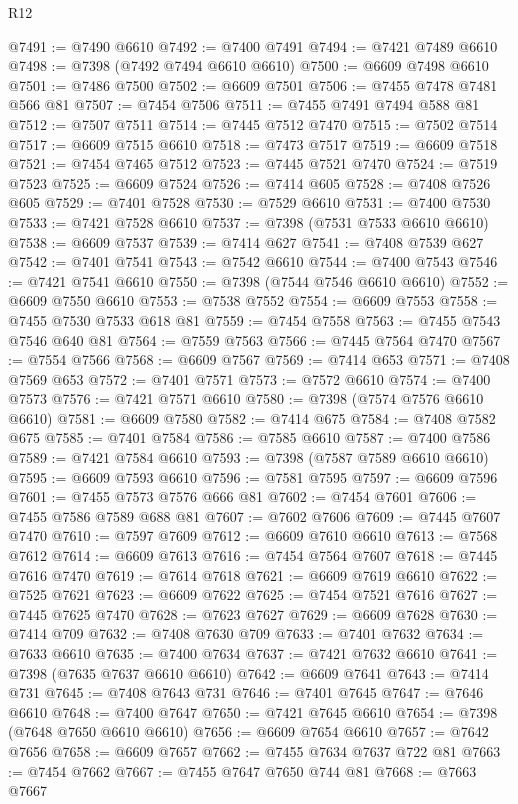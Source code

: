 \begin{lexlean}{R12}
\begin{coremodule}
{{{{{{{{{{{{{{{{{{{{{{{{{{{{{{{{{{{{{{{{{{{{{{{{{{{{{{{{{{{{{{{{{{{{{{{{{{{{{{{{{{@7491 := @7490 @6610
@7492 := @7400 @7491
@7494 := @7421 @7489 @6610
@7498 := @7398 (@7492 @7494 @6610 @6610)
@7500 := @6609 @7498 @6610
@7501 := @7486 @7500
@7502 := @6609 @7501
@7506 := @7455 @7478 @7481 @566 @81
@7507 := @7454 @7506
@7511 := @7455 @7491 @7494 @588 @81
@7512 := @7507 @7511
@7514 := @7445 @7512 @7470
@7515 := @7502 @7514
@7517 := @6609 @7515 @6610
@7518 := @7473 @7517
@7519 := @6609 @7518
@7521 := @7454 @7465 @7512
@7523 := @7445 @7521 @7470
@7524 := @7519 @7523
@7525 := @6609 @7524
@7526 := @7414 @605
@7528 := @7408 @7526 @605
@7529 := @7401 @7528
@7530 := @7529 @6610
@7531 := @7400 @7530
@7533 := @7421 @7528 @6610
@7537 := @7398 (@7531 @7533 @6610 @6610)
@7538 := @6609 @7537
@7539 := @7414 @627
@7541 := @7408 @7539 @627
@7542 := @7401 @7541
@7543 := @7542 @6610
@7544 := @7400 @7543
@7546 := @7421 @7541 @6610
@7550 := @7398 (@7544 @7546 @6610 @6610)
@7552 := @6609 @7550 @6610
@7553 := @7538 @7552
@7554 := @6609 @7553
@7558 := @7455 @7530 @7533 @618 @81
@7559 := @7454 @7558
@7563 := @7455 @7543 @7546 @640 @81
@7564 := @7559 @7563
@7566 := @7445 @7564 @7470
@7567 := @7554 @7566
@7568 := @6609 @7567
@7569 := @7414 @653
@7571 := @7408 @7569 @653
@7572 := @7401 @7571
@7573 := @7572 @6610
@7574 := @7400 @7573
@7576 := @7421 @7571 @6610
@7580 := @7398 (@7574 @7576 @6610 @6610)
@7581 := @6609 @7580
@7582 := @7414 @675
@7584 := @7408 @7582 @675
@7585 := @7401 @7584
@7586 := @7585 @6610
@7587 := @7400 @7586
@7589 := @7421 @7584 @6610
@7593 := @7398 (@7587 @7589 @6610 @6610)
@7595 := @6609 @7593 @6610
@7596 := @7581 @7595
@7597 := @6609 @7596
@7601 := @7455 @7573 @7576 @666 @81
@7602 := @7454 @7601
@7606 := @7455 @7586 @7589 @688 @81
@7607 := @7602 @7606
@7609 := @7445 @7607 @7470
@7610 := @7597 @7609
@7612 := @6609 @7610 @6610
@7613 := @7568 @7612
@7614 := @6609 @7613
@7616 := @7454 @7564 @7607
@7618 := @7445 @7616 @7470
@7619 := @7614 @7618
@7621 := @6609 @7619 @6610
@7622 := @7525 @7621
@7623 := @6609 @7622
@7625 := @7454 @7521 @7616
@7627 := @7445 @7625 @7470
@7628 := @7623 @7627
@7629 := @6609 @7628
@7630 := @7414 @709
@7632 := @7408 @7630 @709
@7633 := @7401 @7632
@7634 := @7633 @6610
@7635 := @7400 @7634
@7637 := @7421 @7632 @6610
@7641 := @7398 (@7635 @7637 @6610 @6610)
@7642 := @6609 @7641
@7643 := @7414 @731
@7645 := @7408 @7643 @731
@7646 := @7401 @7645
@7647 := @7646 @6610
@7648 := @7400 @7647
@7650 := @7421 @7645 @6610
@7654 := @7398 (@7648 @7650 @6610 @6610)
@7656 := @6609 @7654 @6610
@7657 := @7642 @7656
@7658 := @6609 @7657
@7662 := @7455 @7634 @7637 @722 @81
@7663 := @7454 @7662
@7667 := @7455 @7647 @7650 @744 @81
@7668 := @7663 @7667
}}}}}}}}}}}}}}}}}}}}}}}}}}}}}}}}}}}}}}}}}}}}}}}}}}}}}}}}}}}}}}}}}}}}}}}}}}}}}}}}}}
\end{coremodule}
\end{lexlean}
